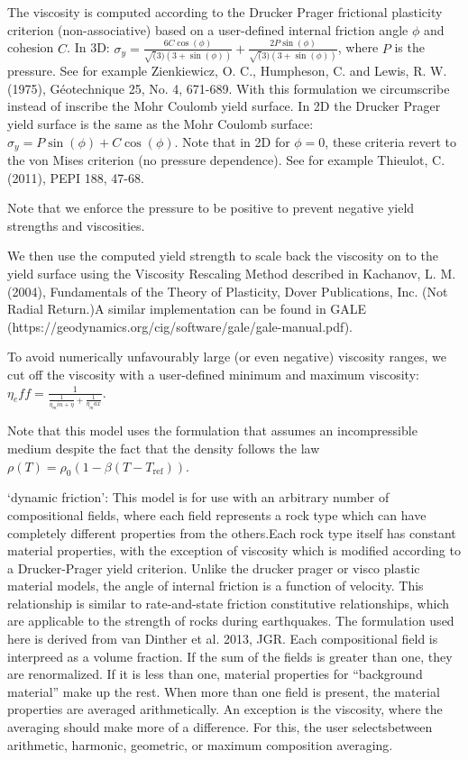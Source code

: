 \begin{itemize}
The viscosity is computed according to the Drucker Prager frictional plasticity criterion (non-associative) based on a user-defined internal friction angle $\phi$ and cohesion $C$. In 3D:  $\sigma_y = \frac{6 C \cos(\phi)}{\sqrt(3) (3+\sin(\phi))} + \frac{2 P \sin(\phi)}{\sqrt(3) (3+\sin(\phi))}$, where $P$ is the pressure. See for example Zienkiewicz, O. C., Humpheson, C. and Lewis, R. W. (1975), G\'{e}otechnique 25, No. 4, 671-689. With this formulation we circumscribe instead of inscribe the Mohr Coulomb yield surface. In 2D the Drucker Prager yield surface is the same as the Mohr Coulomb surface:  $\sigma_y = P \sin(\phi) + C \cos(\phi)$. Note that in 2D for $\phi=0$, these criteria revert to the von Mises criterion (no pressure dependence). See for example Thieulot, C. (2011), PEPI 188, 47-68. 

Note that we enforce the pressure to be positive to prevent negative yield strengths and viscosities. 

We then use the computed yield strength to scale back the viscosity on to the yield surface using the Viscosity Rescaling Method described in Kachanov, L. M. (2004), Fundamentals of the Theory of Plasticity, Dover Publications, Inc. (Not Radial Return.)A similar implementation can be found in GALE (https://geodynamics.org/cig/software/gale/gale-manual.pdf). 

To avoid numerically unfavourably large (or even negative) viscosity ranges, we cut off the viscosity with a user-defined minimum and maximum viscosity: $\eta_eff = \frac{1}{\frac{1}{\eta_min + \eta}+ \frac{1}{\eta_max}}$. 

Note that this model uses the formulation that assumes an incompressible medium despite the fact that the density follows the law $\rho(T)=\rho_0(1-\beta(T-T_{\text{ref}}))$. 

`dynamic friction': This model is for use with an arbitrary number of compositional fields, where each field represents a rock type which can have completely different properties from the others.Each rock type itself has constant material properties, with the exception of viscosity which is modified according to a Drucker-Prager yield criterion. Unlike the drucker prager or visco plastic material models, the angle of internal friction is a function of velocity. This relationship is similar to rate-and-state friction constitutive relationships, which are applicable to the strength of rocks during earthquakes. The formulation used here is derived from van Dinther et al. 2013, JGR. Each compositional field is interpreed as a volume fraction. If the sum of the fields is greater than one, they are renormalized. If it is less than one, material properties for ``background material'' make up the rest. When more than one field is present, the material properties are averaged arithmetically. An exception is the viscosity, where the averaging should make more of a difference. For this, the user selectsbetween arithmetic, harmonic, geometric, or maximum composition averaging. 


\end{itemize}
